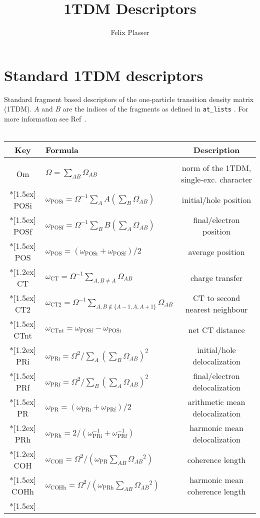 \documentclass[12pt,a4paper]{article}
\author{Felix Plasser}
\title{1TDM Descriptors}
\newcommand{\om}[1]{\omega_{\textrm{#1}}}
\begin{document}
\section{Standard 1TDM descriptors}
Standard fragment based descriptors of the one-particle transition density matrix (1TDM).
$A$ and $B$ are the indices of the fragments as defined in \texttt{at\_lists} .
For more information see Ref~\cite{DMAT}.
\\~\\
\begin{tabular}{clc}
\hline 
\textbf{Key} & \textbf{Formula} & \textbf{Description} \\ 
\hline
\\
Om & $\Omega = \sum_{AB}\Omega_{AB}$ & norm of the 1TDM, single-exc. character \\*[1.5ex]
POSi & $\om{POSi}=\Omega^{-1}\sum_A A\left(\sum_B \Omega_{AB}\right)$ & initial/hole position	 \\*[1.5ex]
POSf & $\om{POSf}=\Omega^{-1}\sum_B B\left(\sum_A \Omega_{AB}\right)$ & final/electron position	 \\*[1.5ex]
POS & $\om{POS}=(\om{POSi} + \om{POSf})/2$ & average position \\*[1.2ex]
CT  & $\om{CT}=\Omega^{-1}\sum_{A,B\neq A}\Omega_{AB}$ & charge transfer \\*[1.5ex]
CT2  & $\om{CT2}=\Omega^{-1}\sum_{A,B\not\in \lbrace A-1,A,A+1\rbrace}\Omega_{AB}$ & CT to second nearest neighbour \\*[1.5ex]
CTnt & $\om{CTnt}=\om{POSf} - \om{POSi}$ & net CT distance \\*[1.2ex]
PRi & $\om{PRi}=\Omega^{2}/\sum_A\left(\sum_B \Omega_{AB}\right)^2$ & initial/hole delocalization \\*[1.5ex]
PRf & $\om{PRf}=\Omega^{2}/\sum_B\left(\sum_A \Omega_{AB}\right)^2$ & final/electron delocalization \\*[1.5ex]
PR & $\om{PR}=(\om{PRi}+\om{PRf})/2$ & arithmetic mean delocalization\\*[1.2ex]
PRh & $\om{PRh}=2/(\om{PRi}^{-1}+\om{PRf}^{-1})$ & harmonic mean delocalization\\*[1.2ex]
COH & $\om{COH}=\Omega^{2}/\left(\om{PR}\sum_{AB}\Omega_{AB}{}^2\right)$ & coherence length\\*[1.5ex]
COHh & $\om{COHh}=\Omega^{2}/\left(\om{PRh}\sum_{AB}\Omega_{AB}{}^2\right)$ & harmonic mean coherence length\\*[1.5ex]
\hline 
\end{tabular} 
\end{document}
